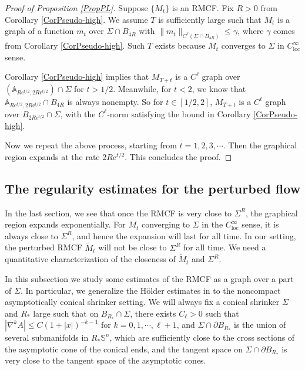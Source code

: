 \documentclass[12pt]{amsart}
\numberwithin{equation}{section}
\numberwithin{equation}{section}
\DeclareMathOperator{\loc}{loc}
\begin{document}
	\begin{proof}[Proof of Proposition \ref{PropPL}]
		Suppose $\{M_t\}$ is an RMCF.  Fix $R>0$ from Corollary \ref{CorPseudo-high}. We assume $T$ is sufficiently large such that $M_t$ is a graph of a function $m_t$ over $\Sigma\cap B_{4R}$ with $\|m_t\|_{C^\ell(\Sigma\cap B_{4R})}\leq \gamma$, where $\gamma$ comes from Corollary \ref{CorPseudo-high}. Such $T$ exists because $M_t$ converges to $\Sigma$ in $C_{\loc}^\infty$ sense.
		
		Corollary \ref{CorPseudo-high} implies that $M_{T+t}$ is a $C^\ell$ graph over $(\mathbb A_{R \mathrm{e}^{t/2},2R \mathrm{e}^{t/2}})\cap\Sigma$ for $t>1/2$. Meanwhile, for $t<2$, we know that $\mathbb A_{R \mathrm{e}^{t/2},2R \mathrm{e}^{t/2}}\cap B_{4R}$ is always nonempty. So for $t\in[1/2,2]$, $M_{T+t}$ is a $C^\ell$ graph over $B_{2R \mathrm{e}^{t/2}}\cap \Sigma$, with the $C^\ell$-norm satisfying the bound in Corollary \ref{CorPseudo-high}. 
		
		Now we repeat the above process, starting from $t=1,2,3,\cdots$. Then the graphical region expands at the rate $2R\mathrm{e}^{t/2}$. This concludes the proof.	
	\end{proof}
	
	
	\subsection{The regularity estimates for the perturbed flow}\label{SSHolder}
	In the last section, we see that once the RMCF is very close to $\Sigma^R$, the graphical region expands exponentially. For $M_t$ converging to $\Sigma$ in the $C^\infty_{\loc}$ sense, it is always close to $\Sigma^R$, and hence the expansion will last for all time. In our setting, the perturbed RMCF $\widetilde{M}_t$ will not be close to $\Sigma^R$ for all time. We need a quantitative characterization of the closeness of $\widetilde{M}_t$ and $\Sigma^R$.
	
	In this subsection we study some estimates of the RMCF as a graph over a part of $\Sigma$. In particular, we generalize the H\"older estimates in \cite{CM2} to the noncompact asymptotically conical shrinker setting. We will always fix a conical shrinker $\Sigma$ and $R_*$ large such that on $B_{R_*}\cap \Sigma$, there exists $C_\ell>0$ such that $|\nabla^k A|\leq C(1+|x|)^{-k-1}$ for $k=0,1,\cdots,\ell+1$, and $\Sigma\cap \partial B_{R_*}$ is the union of several submanifolds in $R_*\mathbb S^n$, which are sufficiently close to the cross sections of the asymptotic cone of the conical ends, and the tangent space on $\Sigma\cap \partial B_{R_*}$ is very close to the tangent space of the asymptotic cones. 
	
\end{document}
